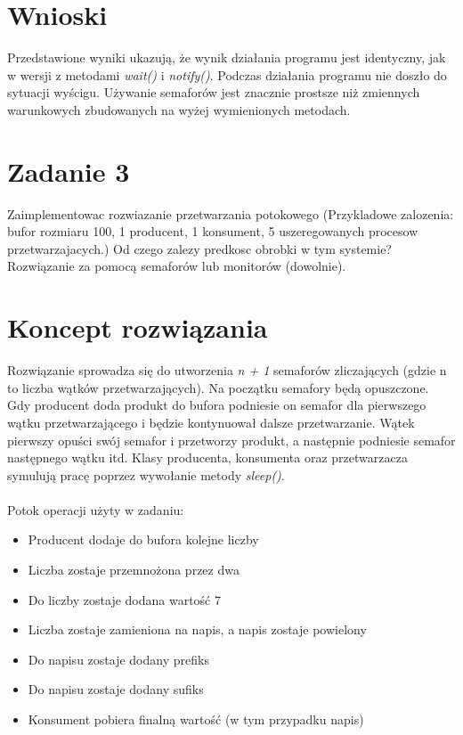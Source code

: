 \documentclass[12pt]{article}
\begin{document}
\section{Wnioski}
Przedstawione wyniki ukazują, że wynik działania programu jest identyczny, jak w wersji z metodami \emph{wait()} i \emph{notify()}. Podczas działania programu nie doszło do sytuacji wyścigu. Używanie semaforów jest znacznie prostsze niż zmiennych warunkowych zbudowanych na wyżej wymienionych metodach.


\newpage
\section{Zadanie 3}
Zaimplementowac rozwiazanie przetwarzania potokowego (Przykladowe zalozenia: bufor rozmiaru 100, 1 producent, 1 konsument, 5 uszeregowanych procesow przetwarzajacych.) Od czego zalezy predkosc obrobki w tym systemie? Rozwiązanie za pomocą semaforów lub monitorów (dowolnie).

\section{Koncept rozwiązania}
Rozwiązanie sprowadza się do utworzenia \emph{n + 1} semaforów zliczających (gdzie n to liczba wątków przetwarzających). Na początku semafory będą opuszczone. Gdy producent doda produkt do bufora podniesie on semafor dla pierwszego wątku przetwarzającego i będzie kontynuował dalsze przetwarzanie. Wątek pierwszy opuści swój semafor i przetworzy produkt, a następnie podniesie semafor następnego wątku itd. Klasy producenta, konsumenta oraz przetwarzacza symulują pracę poprzez wywołanie metody \emph{sleep()}.
\\
\\
Potok operacji użyty w zadaniu:
\begin{itemize}
    \item Producent dodaje do bufora kolejne liczby
    \item Liczba zostaje przemnożona przez dwa
    \item Do liczby zostaje dodana wartość 7
    \item Liczba zostaje zamieniona na napis, a napis zostaje powielony
    \item Do napisu zostaje dodany prefiks
    \item Do napisu zostaje dodany sufiks
    \item Konsument pobiera finalną wartość (w tym przypadku napis)
\end{itemize}
\end{document}
